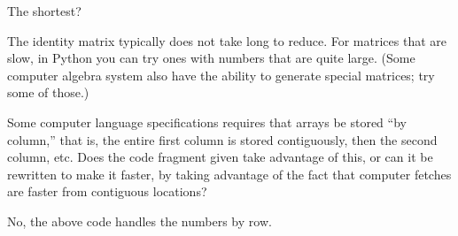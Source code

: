 \begin{exercises}
    The shortest?
    \begin{answer}
      The identity matrix typically does not take long to reduce.
      For matrices that are slow, in Python you can try ones with numbers that
      are quite large.
      (Some computer algebra system also have the ability to generate
      special matrices; try some of those.)
    \end{answer}
  \item Some computer language specifications requires that arrays be
    stored ``by column,'' that is, the entire first column is stored
    contiguously, then the second column, etc.
    Does the code fragment given take advantage of this,
    or can it be rewritten to make it faster, by taking advantage of
    the fact that computer fetches are faster from contiguous locations?
    \begin{answer}
      No, the above code handles the numbers by row.
    \end{answer}
\end{exercises}
\endinput
